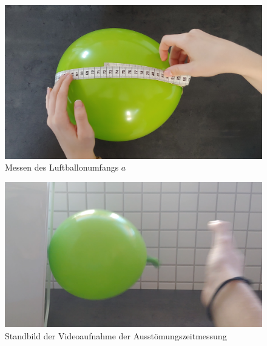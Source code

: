 \documentclass{article}
\begin{document}
    \printbibliography[title={Quellen}]

    \begin{figure}[!h]\label{fig:Umfang}
        \centering
        \includegraphics[width=\textwidth]{luftballon_umfang_messung.jpg}
        \caption{Messen des Luftballonumfangs \(a\)}
    \end{figure}

    \begin{figure}[!h]\label{fig:Festgeklebt}
        \centering
        \includegraphics[width=\textwidth]{lufballon_festgeklebt.png}
        \caption{Standbild der Videoaufnahme der Ausstömungszeitmessung}
    \end{figure}
\end{document}
